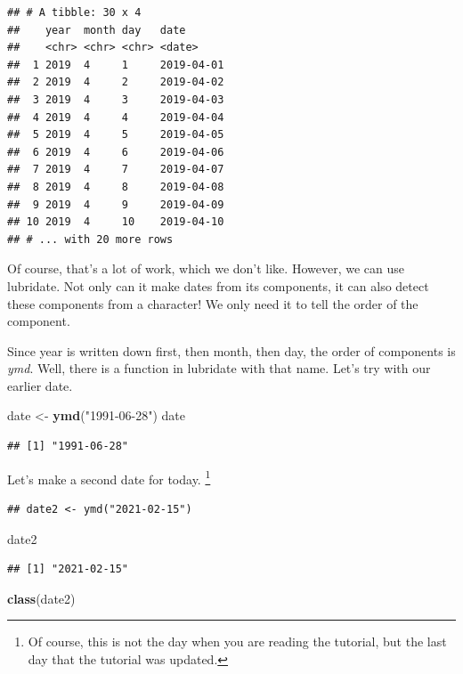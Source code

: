 \documentclass[]{tufte-book}
\newenvironment{Shaded}{}{}
\newcommand{\KeywordTok}[1]{\textcolor[rgb]{0.00,0.44,0.13}{\textbf{#1}}}
\newcommand{\NormalTok}[1]{#1}
\newcommand{\StringTok}[1]{\textcolor[rgb]{0.25,0.44,0.63}{#1}}
\begin{document}
\begin{verbatim}
## # A tibble: 30 x 4
##    year  month day   date      
##    <chr> <chr> <chr> <date>    
##  1 2019  4     1     2019-04-01
##  2 2019  4     2     2019-04-02
##  3 2019  4     3     2019-04-03
##  4 2019  4     4     2019-04-04
##  5 2019  4     5     2019-04-05
##  6 2019  4     6     2019-04-06
##  7 2019  4     7     2019-04-07
##  8 2019  4     8     2019-04-08
##  9 2019  4     9     2019-04-09
## 10 2019  4     10    2019-04-10
## # ... with 20 more rows
\end{verbatim}

Of course, that's a lot of work, which we don't like. However, we can use lubridate. Not only can it make dates from its components, it can also detect these components from a character! We only need it to tell the order of the component.

Since year is written down first, then month, then day, the order of components is \emph{ymd}. Well, there is a function in lubridate with that name. Let's try with our earlier date.

\begin{Shaded}
\begin{Highlighting}[]
\NormalTok{date <-}\StringTok{ }\KeywordTok{ymd}\NormalTok{(}\StringTok{"1991-06-28"}\NormalTok{)}
\NormalTok{date}
\end{Highlighting}
\end{Shaded}

\begin{verbatim}
## [1] "1991-06-28"
\end{verbatim}

Let's make a second date for today. \footnote{Of course, this is not the day when you are reading the tutorial, but the last day that the tutorial was updated.}

\begin{verbatim}
## date2 <- ymd("2021-02-15")
\end{verbatim}

\begin{Shaded}
\begin{Highlighting}[]
\NormalTok{date2}
\end{Highlighting}
\end{Shaded}

\begin{verbatim}
## [1] "2021-02-15"
\end{verbatim}

\begin{Shaded}
\begin{Highlighting}[]
\KeywordTok{class}\NormalTok{(date2)}
\end{Highlighting}
\end{Shaded}
\end{document}
